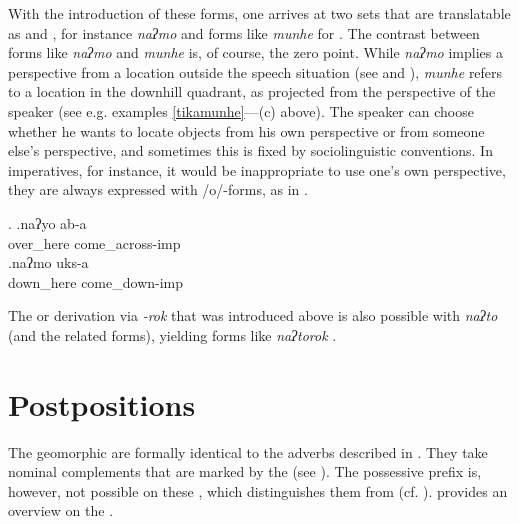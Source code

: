 
With the introduction of these forms, one arrives at two sets that are translatable as  and , for instance \emph{naʔmo}  and forms like  \emph{munhe} for . The  contrast between forms like  \emph{naʔmo}  and  \emph{munhe} is, of course, the zero point. While \emph{naʔmo} implies a perspective from a location outside the speech situation (see \Last and \Next), \emph{munhe} refers to a location in the downhill quadrant, as projected from the perspective of the speaker (see e.g. examples \ref{tikamunhe}—(c) above).  The speaker can choose whether he wants to locate objects from his own perspective or from someone else's perspective, and sometimes this is fixed by sociolinguistic conventions. In imperatives, for instance, it would be inappropriate to use one's own perspective, they are always expressed with /o/-forms, as in \Next. 

\ex. \ag.naʔyo ab-a\\
over\_here come\_across{\sc -imp}\\
\bg.naʔmo uks-a\\
down\_here come\_down{\sc -imp}\\


The  or  derivation via \emph{-rok} that was introduced above is also possible with \emph{naʔto} (and the related forms), yielding forms like \emph{naʔtorok} .



\section{Postpositions}\label{geomorph-postp}

The geomorphic  are formally identical to the adverbs described in . They take nominal complements that are marked by the   (see ). The possessive prefix is, however, not possible on these , which distinguishes  them from  (cf. ).  provides an overview on the .

